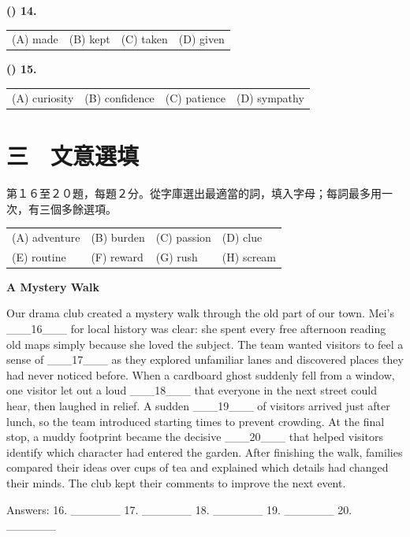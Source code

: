 \documentclass[11pt,a4paper]{article}
\newenvironment{qblock}{\par\vspace{3pt}\noindent\begin{minipage}{\linewidth}}{\end{minipage}\par\vspace{4pt}}
\begin{document}
\begin{qblock}
\textbf{(\hspace{0.6cm}) 14.} 
\par
\begin{tabularx}{\linewidth}{@{}XXXX@{}}
(A) made & (B) kept & (C) taken & (D) given
\end{tabularx}
\end{qblock}
\begin{qblock}
\textbf{(\hspace{0.6cm}) 15.} 
\par
\begin{tabularx}{\linewidth}{@{}XXXX@{}}
(A) curiosity & (B) confidence & (C) patience & (D) sympathy
\end{tabularx}
\end{qblock}
\section*{三　文意選填}
{\small 第１６至２０題，每題２分。從字庫選出最適當的詞，填入字母；每詞最多用一次，有三個多餘選項。
\par\smallskip
}
\begin{center}\begin{tabular}{llll}
(A) adventure & (B) burden & (C) passion & (D) clue\\
(E) routine & (F) reward & (G) rush & (H) scream\\
\end{tabular}\end{center}
\textbf{A Mystery Walk}\par\smallskip
Our drama club created a mystery walk through the old part of our town. Mei's \_\_\_16\_\_\_ for local history was clear: she spent every free afternoon reading old maps simply because she loved the subject. The team wanted visitors to feel a sense of \_\_\_17\_\_\_ as they explored unfamiliar lanes and discovered places they had never noticed before. When a cardboard ghost suddenly fell from a window, one visitor let out a loud \_\_\_18\_\_\_ that everyone in the next street could hear, then laughed in relief. A sudden \_\_\_19\_\_\_ of visitors arrived just after lunch, so the team introduced starting times to prevent crowding. At the final stop, a muddy footprint became the decisive \_\_\_20\_\_\_ that helped visitors identify which character had entered the garden. After finishing the walk, families compared their ideas over cups of tea and explained which details had changed their minds. The club kept their comments to improve the next event.
\par\smallskip
Answers: 16. \_\_\_\_\_\_   17. \_\_\_\_\_\_   18. \_\_\_\_\_\_   19. \_\_\_\_\_\_   20. \_\_\_\_\_\_
\par\smallskip
\end{document}
